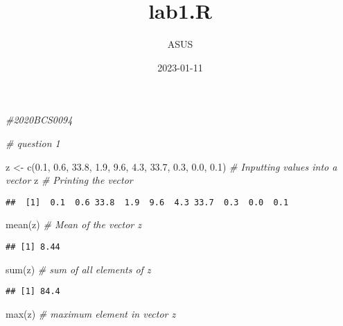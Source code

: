 \documentclass[
]{article}
\title{lab1.R}
\author{ASUS}
\date{2023-01-11}
\newenvironment{Shaded}{\begin{snugshade}}{\end{snugshade}}
\newcommand{\CommentTok}[1]{\textcolor[rgb]{0.56,0.35,0.01}{\textit{#1}}}
\newcommand{\FloatTok}[1]{\textcolor[rgb]{0.00,0.00,0.81}{#1}}
\newcommand{\FunctionTok}[1]{\textcolor[rgb]{0.00,0.00,0.00}{#1}}
\newcommand{\NormalTok}[1]{#1}
\newcommand{\OtherTok}[1]{\textcolor[rgb]{0.56,0.35,0.01}{#1}}
\begin{document}
\maketitle

\begin{Shaded}
\begin{Highlighting}[]
\CommentTok{\#2020BCS0094}

\CommentTok{\# question 1}

\NormalTok{z }\OtherTok{\textless{}{-}} \FunctionTok{c}\NormalTok{(}\FloatTok{0.1}\NormalTok{, }\FloatTok{0.6}\NormalTok{, }\FloatTok{33.8}\NormalTok{, }\FloatTok{1.9}\NormalTok{, }\FloatTok{9.6}\NormalTok{, }\FloatTok{4.3}\NormalTok{, }\FloatTok{33.7}\NormalTok{, }\FloatTok{0.3}\NormalTok{, }\FloatTok{0.0}\NormalTok{, }\FloatTok{0.1}\NormalTok{) }\CommentTok{\# Inputting values into a vector}
\NormalTok{z }\CommentTok{\# Printing the vector}
\end{Highlighting}
\end{Shaded}

\begin{verbatim}
##  [1]  0.1  0.6 33.8  1.9  9.6  4.3 33.7  0.3  0.0  0.1
\end{verbatim}

\begin{Shaded}
\begin{Highlighting}[]
\FunctionTok{mean}\NormalTok{(z) }\CommentTok{\# Mean of the vector z}
\end{Highlighting}
\end{Shaded}

\begin{verbatim}
## [1] 8.44
\end{verbatim}

\begin{Shaded}
\begin{Highlighting}[]
\FunctionTok{sum}\NormalTok{(z) }\CommentTok{\# sum of all elements of z}
\end{Highlighting}
\end{Shaded}

\begin{verbatim}
## [1] 84.4
\end{verbatim}

\begin{Shaded}
\begin{Highlighting}[]
\FunctionTok{max}\NormalTok{(z) }\CommentTok{\# maximum element in vector z}
\end{Highlighting}
\end{Shaded}
\end{document}
